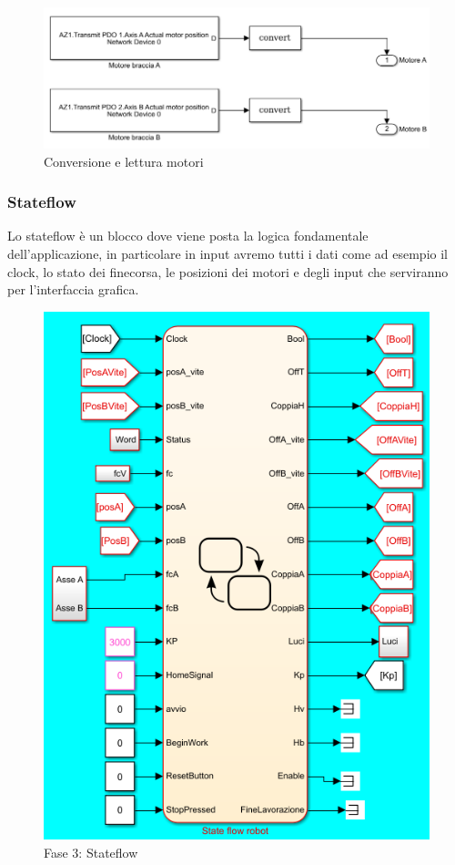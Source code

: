 \begin{figure}[ht]
	\begin{center}
		\includegraphics[scale=0.7]{Immagini/Sperimentale/convertS}
		\caption{Conversione e lettura motori}
		\label{fig:MotorConversion}
	\end{center}
\end{figure}
\subsubsection*{Stateflow}
Lo stateflow è un blocco dove viene posta la logica fondamentale dell'applicazione, in particolare in input avremo tutti i dati come ad esempio il clock, lo stato dei finecorsa, le posizioni dei motori e degli input che serviranno per l'interfaccia grafica. 
\begin{figure}[ht]
	\begin{center}
		\includegraphics[scale=0.65]{Immagini/Sperimentale/sf0}
		\caption{Fase 3: Stateflow}
		\label{fig:Stateflow1}
	\end{center}
\end{figure}
